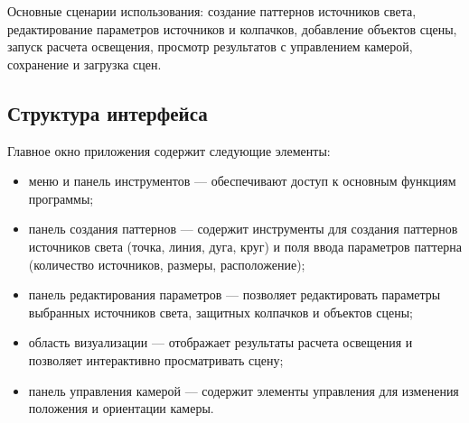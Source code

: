 Основные сценарии использования: создание паттернов источников света, редактирование параметров источников и колпачков, добавление объектов сцены, запуск расчета освещения, просмотр результатов с управлением камерой, сохранение и загрузка сцен.

\subsection{Структура интерфейса}

Главное окно приложения содержит следующие элементы:

\begin{itemize}
    \item меню и панель инструментов --- обеспечивают доступ к основным функциям программы;
    \item панель создания паттернов --- содержит инструменты для создания паттернов источников света (точка, линия, дуга, круг) и поля ввода параметров паттерна (количество источников, размеры, расположение);
    \item панель редактирования параметров --- позволяет редактировать параметры выбранных источников света, защитных колпачков и объектов сцены;
    \item область визуализации --- отображает результаты расчета освещения и позволяет интерактивно просматривать сцену;
    \item панель управления камерой --- содержит элементы управления для изменения положения и ориентации камеры.
\end{itemize}


\clearpage
